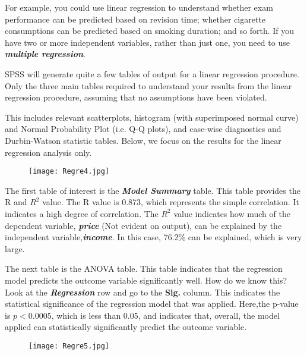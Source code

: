\documentclass[a4paper,12pt]{article}
\begin{document}
For example, you could use linear regression to understand whether exam performance can be predicted based on revision time; whether cigarette consumptions can be predicted based on smoking duration; and so forth. If you have two or more independent variables, rather than just one, you need to use \textbf{\textit{multiple regression}}.

SPSS will generate quite a few tables of output for a linear regression procedure. Only the three main tables required to understand your results from the linear regression procedure, assuming that no assumptions have been violated.

This includes relevant scatterplots, histogram (with superimposed normal curve) and Normal Probability Plot (i.e. Q-Q plots), and case-wise diagnostics and Durbin-Watson statistic tables. Below, we focus on the results for the linear regression analysis only.

\begin{figure}[h!]
\begin{centering}
  \texttt{[image: Regre4.jpg]}\\
\end{centering}
\end{figure}

The first table of interest is the \textbf{\textit{Model Summary}} table. This table provides the R and $R^2$ value. The R value is 0.873, which represents the simple correlation. It indicates a high degree of correlation. The $R^2$ value indicates how much of the dependent variable, \textbf{\textit{price}} (Not evident on output), can be explained by the independent variable,\textbf{\textit{income}}. In this case, 76.2\% can be explained, which is very large.


The next table is the ANOVA table. This table indicates that the regression model predicts the outcome variable significantly well. How do we know this? Look at the \textbf{\textit{Regression}} row and go to the \textbf{Sig.} column. This indicates the statistical significance of the regression model that was applied. Here,the p-value is  $p < 0.0005$, which is less than 0.05, and indicates that, overall, the model applied can statistically significantly predict the outcome variable.

\begin{figure}[h!]
\begin{centering}
  \texttt{[image: Regre5.jpg]}\\
\end{centering}
\end{figure}
\end{document}
